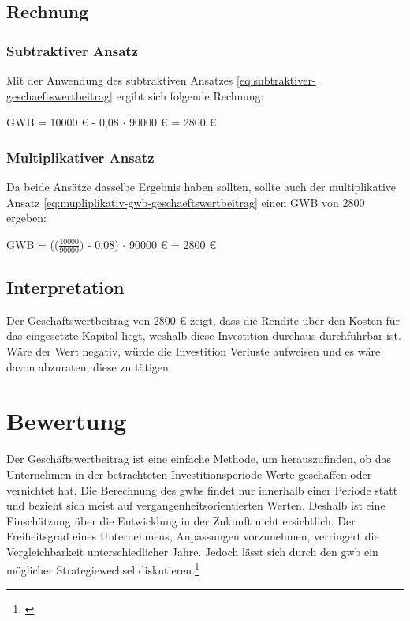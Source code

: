 \subsection{Rechnung}

\subsubsection{Subtraktiver Ansatz}

Mit der Anwendung des subtraktiven Ansatzes \eqref{eq:subtraktiver-geschaeftswertbeitrag} ergibt sich folgende Rechnung:

\bigskip
GWB = 10000 € - 0,08 $\cdot$ 90000 € = 2800 €


\subsubsection{Multiplikativer Ansatz}

Da beide Ansätze dasselbe Ergebnis haben sollten, sollte auch der multiplikative Ansatz \eqref{eq:mupliplikativ-gwb-geschaeftswertbeitrag} einen GWB von 2800 ergeben:

\bigskip
GWB = (($\frac{10000}{90000})$ - 0,08) $\cdot$ 90000 € = 2800 €

\subsection{Interpretation}

Der Geschäftswertbeitrag von 2800 € zeigt, dass die Rendite über den Kosten für das eingesetzte Kapital liegt, weshalb diese Investition durchaus durchführbar ist. Wäre der Wert negativ, würde die Investition Verluste aufweisen und es wäre davon abzuraten, diese zu tätigen.

\section{Bewertung}

Der Geschäftswertbeitrag ist eine einfache Methode, um herauszufinden, ob das Unternehmen in der betrachteten Investitionsperiode Werte geschaffen oder vernichtet hat. Die Berechnung des \ac{gwb}s findet nur innerhalb einer Periode statt und bezieht sich meist auf vergangenheitsorientierten Werten. Deshalb ist eine Einschätzung über die Entwicklung in der Zukunft nicht ersichtlich. Der Freiheitsgrad eines Unternehmens, Anpassungen vorzunehmen, verringert die Vergleichbarkeit unterschiedlicher Jahre. Jedoch lässt sich durch den \ac{gwb} ein möglicher Strategiewechsel diskutieren.\footnote{\cite{controlling-eva}}

